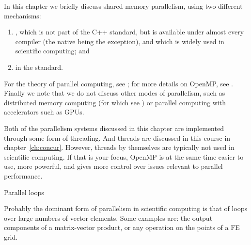 
\let\cxxverbatimsnippet\verbatimsnippet
\newcommand\cverbatimsnippet[2][]{\verbatimsnippet{#2}}
\def\cxxsnippetwithoutput#1#2#3{\verbatimsnippet{#1}}
\def\csnippetwithoutput#1#2#3{\verbatimsnippet{#1}}
\let\indexpetscshow\n
\def\ompstandard#1{OpenMP~#1}

In this chapter we briefly discuss shared memory parallelism,
using two different mechanisms:
\begin{enumerate}
\item
  , which is not part of the C++ standard,
  but is available under almost every compiler
  (the native  being the exception),
  and which is widely used in scientific computing; and
\item {} in the  standard.
\end{enumerate}

For the theory of parallel computing, see ;
for more details on OpenMP, see .
Finally we note that we do not discuss other modes of parallelism,
such as distributed memory computing
(for which see )
or parallel computing with accelerators such as \acp{GPU}.

\begin{remark}
  Both of the parallelism systems discussed in this chapter
  are implemented through some form of threading.
  And threads are discussed in this course in chapter~\ref{ch:concur}.
  However, threads by themselves are typically not used in scientific computing.
  If that is your focus, OpenMP is at the same time easier to use,
  more powerful, and gives more control over issues relevant
  to parallel performance.
\end{remark}

 {Parallel loops}

Probably the dominant form of parallelism in scientific computing
is that of loops over large numbers of vector elements.
Some examples are:
the output components of a matrix-vector product,
or any operation on the points of a \ac{FE} grid.

